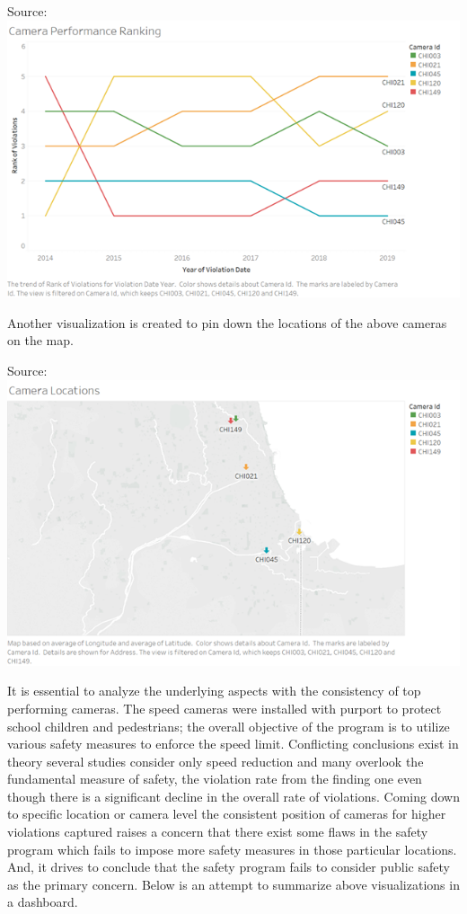 \documentclass[]{book}
\begin{document}
Source:\citep{tableau}
\includegraphics{images/Image6.png}

Another visualization is created to pin down the locations of the above cameras on the map.

Source:\citep{tableau}
\includegraphics{images/Image7.png}

It is essential to analyze the underlying aspects with the consistency of top performing cameras. The speed cameras were installed with purport to protect school children and pedestrians; the overall objective of the program is to utilize various safety measures to enforce the speed limit. Conflicting conclusions exist in theory several studies consider only speed reduction and many overlook the fundamental measure of safety, the violation rate from the finding one even though there is a significant decline in the overall rate of violations. Coming down to specific location or camera level the consistent position of cameras for higher violations captured raises a concern that there exist some flaws in the safety program which fails to impose more safety measures in those particular locations. And, it drives to conclude that the safety program fails to consider public safety as the primary concern.
Below is an attempt to summarize above visualizations in a dashboard.
\end{document}
